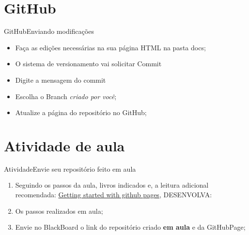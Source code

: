 \documentclass{beamer}
\begin{document}
\section{GitHub}
\begin{frame}{GitHub}{Enviando modificações}
  \begin{itemize}
   \item Faça as edições necessárias na sua página HTML na pasta docs;
   \item O sistema de versionamento vai solicitar Commit
   \item Digite a mensagem do commit
   \item Escolha o Branch \textit{criado por você};
   \item Atualize a página do repositório no GitHub;
  \end{itemize}

\end{frame}
\section{Atividade de aula}
\begin{frame}{Atividade}{Envie seu repositório feito em aula}
  \begin{enumerate}
      \item Seguindo os passos da aula, livros indicados e, a leitura adicional recomendada: \textcolor{blue}{\href{https://docs.github.com/pt/pages/getting-started-with-github-pages/creating-a-github-pages-site}{Getting started with github pages}}, DESENVOLVA:
      \item Os passos realizados em aula;
      \item Envie no BlackBoard o link do repositório criado \textbf{em aula} e da GitHubPage;
  \end{enumerate}


\end{frame}
\end{document}
